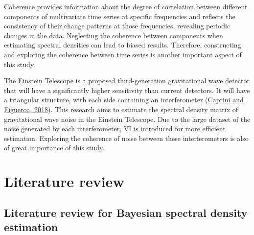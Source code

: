 \documentclass[12pt,a4paper]{article}
\begin{document}
Coherence provides information about the degree of correlation between different components of multivariate time series at specific frequencies and reflects the consistency of their change patterns at those frequencies, revealing periodic changes in the data. Neglecting the coherence between components when estimating spectral densities can lead to biased results. Therefore, constructing and exploring the coherence between time series is another important aspect of this study.

The Einstein Telescope is a proposed third-generation gravitational wave detector that will have a significantly higher sensitivity than current detectors. It will have a triangular structure, with each side containing an interferometer (\hyperref[caprini2018]{Caprini and Figueroa, 2018}). This research aims to estimate the spectral density matrix of gravitational wave noise in the Einstein Telescope. Due to the large dataset of the noise generated by each interferometer, VI is introduced for more efficient estimation. Exploring the coherence of noise between these interferometers is also of great importance of this study.




\section{Literature review}
\subsection{Literature review for Bayesian spectral density estimation}
\end{document}
